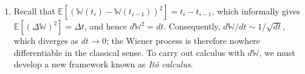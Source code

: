 \begin{enumerate}
    The scaled stock price is given by
    \[\mathbb{S}_{pt} = u^{n_H} d^{n_T} \mathbb{S}_0 = u^{(pt + \mathbb{M}_{pt})/2} d^{(pt - \mathbb{M}_{pt})/2} \mathbb{S}_0.\]
    Choosing $u$ and $d$ such that $ud = 1$ and, in the limit as $p \to \infty$,
    \[u = 1 + \frac{\sigma}{\sqrt{p}}, \qquad d = 1 - \frac{\sigma}{\sqrt{p}},\]
    we obtain
    \[\mathbb{S}_{pt} = \left(1 + \frac{\sigma}{\sqrt{p}}\right)^{(pt + \mathbb{M}_{pt})/2} \left(1 - \frac{\sigma}{\sqrt{p}}\right)^{(pt - \mathbb{M}_{pt})/2} \mathbb{S}_0.\]
    Taking $p \to \infty$ yields
    \[\lim_{p \to \infty} \mathbb{S}_{pt} = \mathbb{S}(t) = \mathbb{S}_0 \exp\!\left(\sigma \mathbb{W}(t) - \frac{1}{2}\sigma^2 t \right),\]
    which is the \emph{geometric Brownian motion}.

    \item Recall that $\mathbb{E}\!\left[(\mathbb{W}(t_i) - \mathbb{W}(t_{i-1}))^2\right] = t_i - t_{i-1}$,
    which informally gives $\mathbb{E}[(\Delta \mathbb{W})^2] = \Delta t$, and hence $d\mathbb{W}^2 = dt$.
    Consequently, $d\mathbb{W}/dt \sim 1/\sqrt{dt}$, which diverges as $dt \to 0$; the Wiener
    process is therefore nowhere differentiable in the classical sense. To carry out calculus with
    $d\mathbb{W}$, we must develop a new framework known as \emph{It\^{o} calculus}.

\end{enumerate}







































